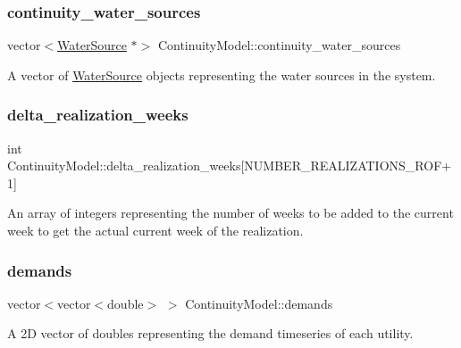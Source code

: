 \subsubsection{\texorpdfstring{continuity\+\_\+water\+\_\+sources}{continuity\_water\_sources}}
{\footnotesize\ttfamily vector$<$\mbox{\hyperlink{classWaterSource}{Water\+Source}} $\ast$$>$ Continuity\+Model\+::continuity\+\_\+water\+\_\+sources\hspace{0.3cm}{\ttfamily [protected]}}



A vector of \mbox{\hyperlink{classWaterSource}{Water\+Source}} objects representing the water sources in the system. 

\mbox{\label{classContinuityModel_aee4088e422a0d3723dc7895c96c9ebe3}} 
\subsubsection{\texorpdfstring{delta\+\_\+realization\+\_\+weeks}{delta\_realization\_weeks}}
{\footnotesize\ttfamily int Continuity\+Model\+::delta\+\_\+realization\+\_\+weeks\mbox{[}N\+U\+M\+B\+E\+R\+\_\+\+R\+E\+A\+L\+I\+Z\+A\+T\+I\+O\+N\+S\+\_\+\+R\+OF+1\mbox{]}\hspace{0.3cm}{\ttfamily [protected]}}



An array of integers representing the number of weeks to be added to the current week to get the actual current week of the realization. 

\mbox{\label{classContinuityModel_a1994ed4d99e0583eac5c82a4b26d9728}} 
\subsubsection{\texorpdfstring{demands}{demands}}
{\footnotesize\ttfamily vector$<$vector$<$double$>$ $>$ Continuity\+Model\+::demands\hspace{0.3cm}{\ttfamily [protected]}}



A 2D vector of doubles representing the demand timeseries of each utility. 

